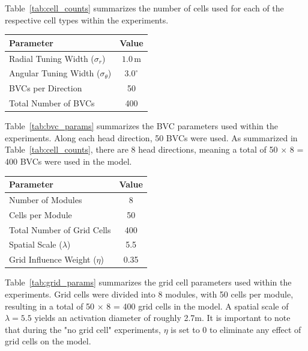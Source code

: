 \documentclass[conference]{IEEEtran}
\begin{document}
Table~\ref{tab:cell_counts} summarizes the number of cells used for each of the respective cell types within the experiments. 

\begin{center}
\label{tab:bvc_params}

\begin{tabular}{l c}
\hline
\textbf{Parameter} & \textbf{Value} \\
\hline
Radial Tuning Width ($\sigma_r$) & $1.0\,\mathrm{m}$ \\
Angular Tuning Width ($\sigma_\theta$) & $3.0^\circ$ \\
BVCs per Direction & 50 \\
Total Number of BVCs & 400 \\
\hline
\end{tabular}
\end{center}


Table~\ref{tab:bvc_params} summarizes the BVC parameters used within the experiments. Along each head direction, 50 BVCs were used. As summarized in Table~\ref{tab:cell_counts}, there are 8 head directions, meaning a total of 50 $\times$ 8 = 400 BVCs were used in the model. 

\begin{center}
\label{tab:grid_params}

\begin{tabular}{l c}
\hline
\textbf{Parameter} & \textbf{Value} \\
\hline
Number of Modules & 8 \\
Cells per Module & 50 \\
Total Number of Grid Cells & 400 \\
Spatial Scale ($\lambda$) & 5.5 \\
Grid Influence Weight ($\eta$) & 0.35 \\
\hline
\end{tabular}
\end{center}


Table~\ref{tab:grid_params} summarizes the grid cell parameters used within the experiments. Grid cells were divided into 8 modules, with 50 cells per module, resulting in a total of 50 $\times$ 8 = 400 grid cells in the model. A spatial scale of $\lambda=5.5$ yields an activation diameter of roughly 2.7m. It is important to note that during the "no grid cell" experiments, $\eta$ is set to 0 to eliminate any effect of grid cells on the model.  
\end{document}
